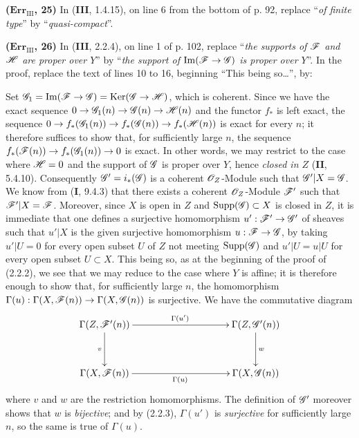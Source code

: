 \noindent\textbf{($\mathbf{Err}_{\mathrm{III}}$, 25)} In (\textbf{III}, 1.4.15), on
line 6 from the bottom of p. 92, replace ``\emph{of finite type}'' by
``\emph{quasi-compact}''.

\noindent\textbf{($\mathbf{Err}_{\mathrm{III}}$, 26)} In (\textbf{III}, 2.2.4), on
line 1 of p. 102, replace ``\emph{the supports of $\mathscr{F}$ and $\mathscr{H}$ are
proper over $Y$}'' by ``\emph{the support of
$\operatorname{Im}(\mathscr{F}\to\mathscr{G})$ is proper over $Y$}''. In the proof,
replace the text of lines 10 to 16, beginning ``This being so\ldots{}'', by:

Set
$\mathscr{G}_1=\operatorname{Im}(\mathscr{F}\to\mathscr{G})
=\operatorname{Ker}(\mathscr{G}\to\mathscr{H})$, which is coherent. Since we have the
exact sequence $0\to\mathscr{G}_1(n)\to\mathscr{G}(n)\to\mathscr{H}(n)$ and the functor
$f_*$ is left exact, the sequence
$0\to f_*(\mathscr{G}_1(n))\to f_*(\mathscr{G}(n))\to f_*(\mathscr{H}(n))$ is exact for every
$n$; it therefore suffices to show that, for sufficiently large $n$, the
sequence $f_*(\mathscr{F}(n))\to f_*(\mathscr{G}_1(n))\to0$ is exact. In other words, we
may restrict to the case where $\mathscr{H}=0$ and the support of $\mathscr{G}$ is
proper over $Y$, hence \emph{closed in $Z$} (\textbf{II}, 5.4.10). Consequently
$\mathscr{G}'=i_*(\mathscr{G})$ is a coherent $\mathscr{O}_Z$-Module such that
$\mathscr{G}'|X=\mathscr{G}$. We know from (\textbf{I}, 9.4.3) that there exists a coherent
$\mathscr{O}_Z$-Module $\mathscr{F}'$ such that $\mathscr{F}'|X=\mathscr{F}$. Moreover, since $X$
is open in $Z$ and $\operatorname{Supp}(\mathscr{G})\subset X$ is closed in $Z$, it
is immediate that one defines a surjective homomorphism
$u':\mathscr{F}'\to\mathscr{G}'$ of sheaves such that $u'|X$ is the given surjective
homomorphism $u:\mathscr{F}\to\mathscr{G}$, by taking $u'|U=0$ for every open subset $U$
of $Z$ not meeting $\operatorname{Supp}(\mathscr{G})$ and $u'|U=u|U$ for every open
subset $U\subset X$. This being so, as at the beginning of the proof of
(2.2.2), we see that we may reduce to the case where $Y$ is affine; it is
therefore enough to show that, for sufficiently large $n$, the homomorphism
$\Gamma(u):\Gamma(X,\mathscr{F}(n))\to\Gamma(X,\mathscr{G}(n))$ is surjective. We have
the commutative diagram
\[
\xymatrix@C=35mm@R=12mm{
\Gamma(Z,\sh{F}'(n)) \ar[r]^{\Gamma(u')} \ar[d]_v &
\Gamma(Z,\sh{G}'(n)) \ar[d]^w \\
\Gamma(X,\sh{F}(n)) \ar[r]_{\Gamma(u)} & \Gamma(X,\sh{G}(n))
}
\]
where $v$ and $w$ are the restriction homomorphisms. The definition of
$\mathscr{G}'$ moreover shows that $w$ is \emph{bijective}; and by (2.2.3),
$\Gamma(u')$ is \emph{surjective} for sufficiently large $n$, so the same is
true of $\Gamma(u)$.

